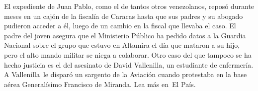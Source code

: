 \documentclass{article}%
\begin{document}
\newline%
%
El expediente de Juan Pablo, como el de tantos otros venezolanos, reposó durante meses en un cajón de la fiscalía de Caracas hasta que sus padres y su abogado pudieron acceder a él, luego de un cambio en la fiscal que llevaba el caso. El padre del joven asegura que el Ministerio Público ha pedido datos a la Guardia Nacional sobre el grupo que estuvo en Altamira el día que mataron a su hijo, pero el alto mando militar se niega a colaborar.%
\newline%
%
Otro caso del que tampoco se ha hecho justicia es el del asesinato de David Vallenilla, un estudiante de enfermería. A Vallenilla~le disparó un sargento de la Aviación cuando protestaba en la base aérea Generalísimo Francisco de Miranda.%
\newline%
%
Lea más en~El País.%
\newline%
%
\end{document}
